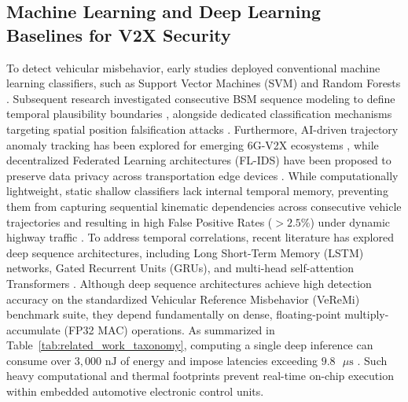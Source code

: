 \documentclass[journal]{IEEEtran}
\begin{document}
\subsection{Machine Learning and Deep Learning Baselines for V2X Security}
To detect vehicular misbehavior, early studies deployed conventional machine learning classifiers, such as Support Vector Machines (SVM) and Random Forests \cite{singh2019machine, so2018integrating}. Subsequent research investigated consecutive BSM sequence modeling to define temporal plausibility boundaries \cite{sharma2022machine}, alongside dedicated classification mechanisms targeting spatial position falsification attacks \cite{ercan2022misbehavior}. Furthermore, AI-driven trajectory anomaly tracking has been explored for emerging 6G-V2X ecosystems \cite{raja2023ai}, while decentralized Federated Learning architectures (FL-IDS) have been proposed to preserve data privacy across transportation edge devices \cite{bhavsar2024fl}. While computationally lightweight, static shallow classifiers lack internal temporal memory, preventing them from capturing sequential kinematic dependencies across consecutive vehicle trajectories and resulting in high False Positive Rates ($>2.5\%$) under dynamic highway traffic \cite{abdelhakeem2025survey, mansourian2025enhancing}. To address temporal correlations, recent literature has explored deep sequence architectures, including Long Short-Term Memory (LSTM) networks, Gated Recurrent Units (GRUs), and multi-head self-attention Transformers \cite{kalogiannis2026attention, alladi2021deep}. Although deep sequence architectures achieve high detection accuracy on the standardized Vehicular Reference Misbehavior (VeReMi) benchmark suite, they depend fundamentally on dense, floating-point multiply-accumulate (FP32 MAC) operations. As summarized in Table~\ref{tab:related_work_taxonomy}, computing a single deep inference can consume over $3{,}000\text{ nJ}$ of energy and impose latencies exceeding $9.8\text{ }\mu\text{s}$ \cite{horowitz2014computing}. Such heavy computational and thermal footprints prevent real-time on-chip execution within embedded automotive electronic control units.
\end{document}
